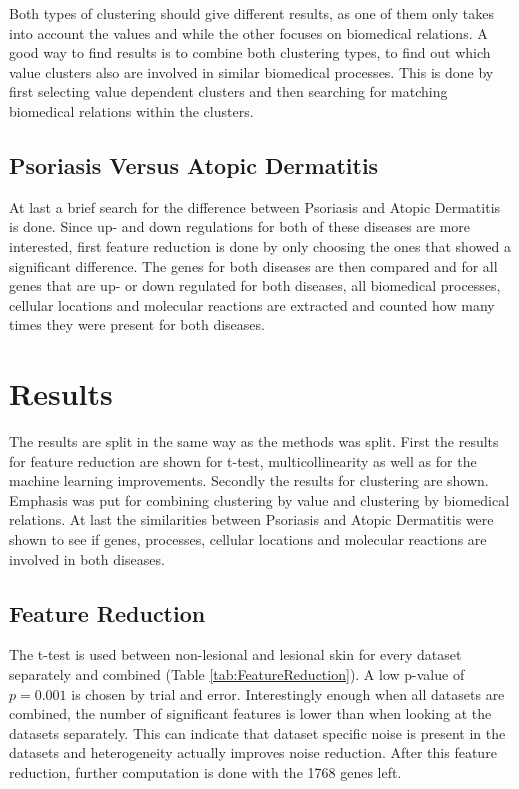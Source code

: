 \documentclass[10pt,a4paper]{article}
\begin{document}
	Both types of clustering should give different results, as one of them only takes into account the values and while the other focuses on biomedical relations. A good way to find results is to combine both clustering types, to find out which value clusters also are involved in similar biomedical processes. This is done by first selecting value dependent clusters and then searching for matching biomedical relations within the clusters.
	
	\subsection{Psoriasis Versus Atopic Dermatitis}
	\label{subsec:MethodsPsoriasisVersusAtopicDermatitis}
	
	At last a brief search for the difference between Psoriasis and Atopic Dermatitis is done. Since up- and down regulations for both of these diseases are more interested, first feature reduction is done by only choosing the ones that showed a significant difference. The genes for both diseases are then compared and for all genes that are up- or down regulated for both diseases, all biomedical processes, cellular locations and molecular reactions are extracted and counted how many times they were present for both diseases. 
	
	\section{Results}
	\label{sec:Results}
	
	The results are split in the same way as the methods was split. First the results for feature reduction are shown for t-test, multicollinearity as well as for the machine learning improvements. Secondly the results for clustering are shown. Emphasis was put for combining clustering by value and clustering by biomedical relations. At last the similarities between Psoriasis and Atopic Dermatitis were shown to see if genes, processes, cellular locations and molecular reactions are involved in both diseases. 
	
	
	\subsection{Feature Reduction}
	\label{subsec:ResultsFeatureResuction}
	
	The t-test is used between non-lesional and lesional skin for every dataset separately and combined (Table \ref{tab:FeatureReduction}). A low p-value of $p=0.001$ is chosen by trial and error. Interestingly enough when all datasets are combined, the number of significant features is lower than when looking at the datasets separately. This can indicate that dataset specific noise is present in the datasets and heterogeneity actually improves noise reduction. After this feature reduction, further computation is done with the 1768 genes left.
	
\end{document}
